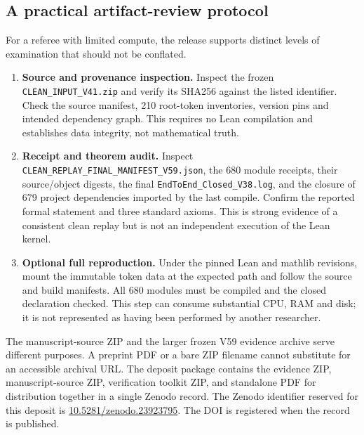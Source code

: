 \documentclass[11pt,a4paper]{article}
\theoremstyle{definition}
\newcommand{\code}[1]{\texttt{#1}}
\begin{document}
\subsection{A practical artifact-review protocol}
\label{sec:review-protocol}
For a referee with limited compute, the release supports distinct
levels of examination that should not be conflated.
\begin{enumerate}[label=\arabic*.,leftmargin=*]
\item \textbf{Source and provenance inspection.} Inspect the frozen
\code{CLEAN\_INPUT\_V41.zip} and verify its SHA256 against the
listed identifier. Check the source manifest, 210 root-token
inventories, version pins and intended dependency graph. This
requires no Lean compilation and establishes data integrity, not
mathematical truth.
\item \textbf{Receipt and theorem audit.} Inspect
\code{CLEAN\_REPLAY\_FINAL\_MANIFEST\_V59.json}, the 680
module receipts, their source/object digests, the final
\code{EndToEnd\_Closed\_V38.log}, and the closure of 679
project dependencies imported by the last compile. Confirm the
reported formal statement and three standard axioms. This is
strong evidence of a consistent clean replay but is not an
independent execution of the Lean kernel.
\item \textbf{Optional full reproduction.} Under the pinned Lean
and mathlib revisions, mount the immutable token data at the
expected  path and follow the
source and build manifests. All 680 modules must be compiled and
the closed declaration checked. This step can consume substantial
CPU, RAM and disk; it is not represented as having been performed
by another researcher.
\end{enumerate}
The manuscript-source ZIP and the larger frozen V59 evidence archive serve different
purposes. A preprint PDF or a bare ZIP filename cannot substitute
for an accessible archival URL. The deposit package contains the evidence ZIP,
manuscript-source ZIP, verification toolkit ZIP, and standalone PDF for
distribution together in a single Zenodo record. The Zenodo identifier reserved for this deposit is
\href{https://doi.org/10.5281/zenodo.23923795}{10.5281/zenodo.23923795}.
The DOI is registered when the record is published.
\end{document}
